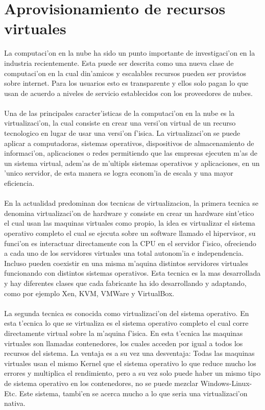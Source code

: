 \chapter{Aprovisionamiento de recursos virtuales}
\label{aprmaqvir}
La computaci'on en la nube ha sido un punto importante de investigaci'on en la industria recientemente. Esta puede ser descrita como una nueva clase de computaci'on en la cual din'amicos y escalables recursos pueden ser provistos sobre internet. Para los usuarios esto es transparente y ellos solo pagan lo que usan de acuerdo a niveles de servicio establecidos con los proveedores de nubes.\\
\\
Una de las principales caracter'isticas de la computaci'on en la nube es la virtualizaci'on, la cual consiste en crear una versi'on virtual de un recurso tecnologico en lugar de usar una versi'on f'isica. La virtualizaci'on se puede aplicar a computadoras, sistemas operativos, dispositivos de almacenamiento de informaci'on, aplicaciones o redes permitiendo que las empresas ejecuten m'as de un sistema virtual, adem'as de m'ultipls sistemas operativos y aplicaciones, en un 'unico servidor, de esta manera se logra econom'ia de escala y una mayor eficiencia.\\
\\
En la actualidad predominan dos tecnicas de virtualizacion, la primera tecnica se denomina virtualizaci'on de hardware y consiste en crear un hardware sint'etico el cual usan las maquinas virtuales como propio, la idea es virtualizar el sistema operativo completo el cual se ejecuta sobre un software llamado el hipervisor, su funci'on es interactuar directamente con la CPU en el servidor f'isico, ofreciendo a cada uno de los servidores virtuales una total autonom'ia e independencia. Incluso pueden coexistir en una misma m'aquina distintos servidores virtuales funcionando con distintos sistemas operativos. Esta tecnica es la mas desarrollada y hay diferentes clases que cada fabricante ha ido desarrollando y adaptando, como por ejemplo Xen, KVM, VMWare y VirtualBox.\\
\\
La segunda tecnica es conocida como virtualizaci'on del sistema operativo. En esta t'ecnica lo que se virtualiza es el sistema operativo completo el cual corre directamente virtual sobre la m'aquina f'isica. En esta t'ecnica las maquinas virtuales son llamadas contenedores, los cuales acceden por igual a todos los recursos del sistema. La ventaja es a su vez una desventaja: Todas las maquinas virtuales usan el mismo Kernel que el sistema operativo lo que reduce mucho los errores y multiplica el rendimiento, pero a su vez solo puede haber un mismo tipo de sistema operativo en los contenedores, no se puede mezclar Windows-Linux-Etc. Este sistema, tambi'en se acerca mucho a lo que seria una virtualizaci'on nativa.\\
